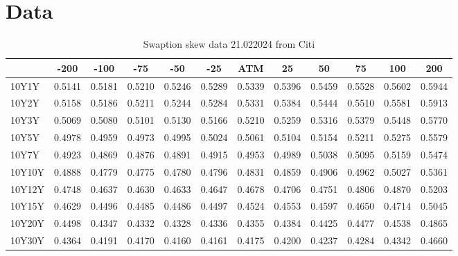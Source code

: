 \section{Data}

\begin{table}[h]
    \centering
    \begin{tabular}{l|*{11}{c}}
        & -200 & -100 & -75 & -50 & -25 & ATM & 25 & 50 & 75 & 100 & 200 \\
    \hline
    10Y1Y & 0.5141 & 0.5181 & 0.5210 & 0.5246 & 0.5289 & 0.5339 & 0.5396 & 0.5459 & 0.5528 & 0.5602 & 0.5944 \\
    10Y2Y & 0.5158 & 0.5186 & 0.5211 & 0.5244 & 0.5284 & 0.5331 & 0.5384 & 0.5444 & 0.5510 & 0.5581 & 0.5913 \\
    10Y3Y & 0.5069 & 0.5080 & 0.5101 & 0.5130 & 0.5166 & 0.5210 & 0.5259 & 0.5316 & 0.5379 & 0.5448 & 0.5770 \\
    10Y5Y & 0.4978 & 0.4959 & 0.4973 & 0.4995 & 0.5024 & 0.5061 & 0.5104 & 0.5154 & 0.5211 & 0.5275 & 0.5579 \\
    10Y7Y & 0.4923 & 0.4869 & 0.4876 & 0.4891 & 0.4915 & 0.4953 & 0.4989 & 0.5038 & 0.5095 & 0.5159 & 0.5474 \\
    10Y10Y & 0.4888 & 0.4779 & 0.4775 & 0.4780 & 0.4796 & 0.4831 & 0.4859 & 0.4906 & 0.4962 & 0.5027 & 0.5361 \\
    10Y12Y & 0.4748 & 0.4637 & 0.4630 & 0.4633 & 0.4647 & 0.4678 & 0.4706 & 0.4751 & 0.4806 & 0.4870 & 0.5203 \\
    10Y15Y & 0.4629 & 0.4496 & 0.4485 & 0.4486 & 0.4497 & 0.4524 & 0.4553 & 0.4597 & 0.4650 & 0.4714 & 0.5045 \\
    10Y20Y & 0.4498 & 0.4347 & 0.4332 & 0.4328 & 0.4336 & 0.4355 & 0.4384 & 0.4425 & 0.4477 & 0.4538 & 0.4865 \\
    10Y30Y & 0.4364 & 0.4191 & 0.4170 & 0.4160 & 0.4161 & 0.4175 & 0.4200 & 0.4237 & 0.4284 & 0.4342 & 0.4660 \\
    \end{tabular}
    \caption{Swaption skew data 21.022024 from Citi}
    \label{tab:swaption_skew_data_2024}
    \end{table}

